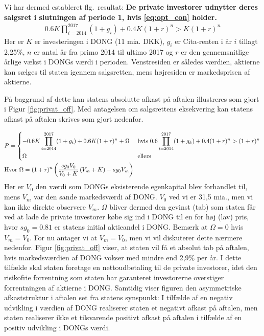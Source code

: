 \documentclass{article}
\begin{document}






Vi har dermed estableret flg.\ resultat: \textbf{De private investorer udnytter deres salgsret i slutningen af periode 1, hvis \eqref{eq:opt_con} holder. } 
\begin{align}
0.6K\prod_{i=2014}^{2017}(1+g_i)+0.4K(1+r)^n>K(1+r)^n \label{eq:opt_con}
\end{align}
Her er $K$ er investeringen i DONG (11 mia. DKK), $g_i$ er Cita-renten i år $i$ tillagt 2,25\%, $n$ er antal år fra primo 2014 til ultimo 2017 og $r$ er den gennemsnitlige årlige vækst i DONGs værdi i perioden. Venstresiden er således værdien, aktierne kan sælges til staten igennem salgsretten, mens højresiden er markedsprisen af aktierne.

På baggrund af dette kan statens absolutte afkast på aftalen illustreres som gjort i Figur \ref{fig:privat_off}. Med antagelsen om salgsrettens eksekvering kan statens afkast på aftalen skrives som gjort nedenfor. %

\begin{align}
&P= 
\begin{dcases} 
-0.6K \prod_{i=2014}^{2017} (1+g_i)+0.6K(1+r)^n +\Omega&\text{     hvis    } 0.6\prod_{i=2014}^{2017}(1+g_k)+0.4(1+r)^n>(1+r)^n \\ 
\Omega  &\text{   ellers }
\end {dcases} \\
&\text{Hvor } \Omega=(1+r)^n\left( \frac{sg_0 V_0}{V_0+K} \left( V_m+K \right)-sg_0 V_m \right)
\label{eq:Goldman_deal}
\end{align}
Her er $V_0$ den værdi som DONGs eksisterende egenkapital blev forhandlet til, mens $V_m$ var den sande markedsværdi af DONG. $V_0$ ved vi er 31,5 mia., men vi kan ikke direkte observere $V_m$. $\Omega$ bliver dermed den gevinst (tab) som staten får ved at lade de private investorer købe sig ind i DONG til en for høj (lav) pris, hvor $sg_0=0.81$ er statens initial aktieandel i DONG. Bemærk at $\Omega=0$ hvis $V_m=V_0$. For nu antager vi at $V_m=V_0$, men vi vil diskuterer dette nærmere nedenfor. Figur \ref{fig:privat_off} viser, at staten vil få et absolut tab på aftalen, hvis markedsværdien af DONG vokser med mindre end 2,9\% per år. I dette tilfælde skal staten foretage en nettoudbetaling til de private investorer, idet den risikofrie forrentning som staten har garanteret investorerne overstiger forrentningen af aktierne i DONG. Samtidig viser figuren den asymmetriske afkaststruktur i aftalen set fra statens synspunkt: I tilfælde af en negativ udvikling i værdien af DONG realiserer staten et negativt afkast på aftalen, men staten realiserer ikke et tilsvarende positivt afkast på aftalen i tilfælde af en positiv udvikling i DONGs værdi. 
\end{document}
